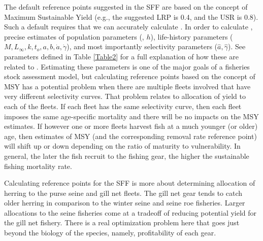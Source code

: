 The default reference points suggested in the SFF are based on the concept of Maximum Sustainable Yield (e.g., the suggested LRP is 0.4\bmsy, and the USR is 0.8\bmsy).  Such a default requires that we can accurately calculate \bmsy.  In order to calculate \bmsy, precise estimates of population parameters (\bo, $h$), life-history parameters ($M,L_\infty,k,t_o,a,b,\dot{a},\dot{\gamma}$), and most importantly selectivity parameters ($\hat{a},\hat{\gamma}$). See parameters defined in Table \ref{Table2} for a full explanation of how these are related to \bmsy.  Estimating these parameters is one of the major goals of a fisheries stock assessment model, but calculating reference points based on the concept of MSY has a potential problem when there are multiple fleets involved that have very different selectivity curves. That problem relates to allocation of yield to each of the fleets.  If each fleet has the same selectivity curve, then each fleet imposes the same age-specific mortality and there will be no impacts on the MSY estimates.  If however one or more fleets harvest fish at a much younger (or older) age, then estimates of MSY (and the corresponding removal rate reference point) will shift up or down depending on the ratio of maturity to vulnerability.  In general, the later the fish recruit to the fishing gear, the higher the sustainable fishing mortality rate.  

Calculating reference points for the SFF is more about determining allocation of herring to the purse seine and gill net fleets.  The gill net gear tends to catch older herring in comparison to the winter seine and seine roe fisheries.  Larger allocations to the seine fisheries come at a tradeoff of reducing potential yield for the gill net fishery.  There is a real optimization problem here that goes just beyond the biology of the species, namely, profitability of each gear. 



